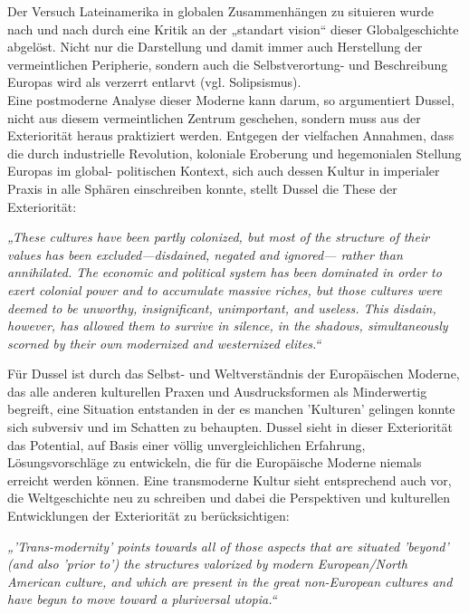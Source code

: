Der Versuch Lateinamerika in globalen Zusammenhängen zu situieren wurde nach und
nach durch eine Kritik an der „standart vision“\footnotemark {} dieser Globalgeschichte
abgelöst. Nicht nur die Darstellung und damit immer auch Herstellung der
vermeintlichen Peripherie, sondern auch die Selbstverortung- und Beschreibung
Europas wird als verzerrt entlarvt (vgl. Solipsismus).\footnotemark
{}\\
 Eine postmoderne Analyse
dieser Moderne kann darum, so argumentiert Dussel, nicht aus diesem
vermeintlichen Zentrum geschehen, sondern muss aus der Exteriorität heraus
praktiziert werden. Entgegen der vielfachen Annahmen, dass die durch
industrielle Revolution, koloniale Eroberung und hegemonialen Stellung Europas
im global- politischen Kontext, sich auch dessen Kultur in imperialer Praxis in alle Sphären einschreiben konnte, stellt Dussel die These der Exteriorität:
\begin{myenv} 
    \textit{„These cultures have been partly colonized, but most of the
    structure of their values has been excluded—disdained, negated and ignored—
    rather than annihilated. The economic and political system has been
    dominated in order to exert colonial power and to accumulate massive riches,
    but those cultures were deemed to be unworthy, insignificant, unimportant,
    and useless. This disdain, however, has allowed them to survive in silence,
in the shadows, simultaneously scorned by their own modernized and westernized
elites.“\footnotemark {}} \end{myenv}

Für Dussel ist durch das Selbst- und Weltverständnis der Europäischen Moderne,
das alle anderen kulturellen Praxen und Ausdrucksformen als Minderwertig
begreift, eine Situation entstanden in der es manchen 'Kulturen' gelingen konnte
sich subversiv und im Schatten zu behaupten. Dussel sieht in dieser Exteriorität
das Potential, auf Basis einer völlig unvergleichlichen Erfahrung,
Lösungsvorschläge zu entwickeln, die für die Europäische Moderne niemals
erreicht werden können. Eine transmoderne Kultur sieht entsprechend auch vor,
die Weltgeschichte neu zu schreiben und dabei die Perspektiven und kulturellen
Entwicklungen der Exteriorität zu berücksichtigen:

\begin{myenv} \textit{„'Trans-modernity' points towards all of those aspects
    that are situated 'beyond' (and also 'prior to') the structures valorized by
    modern European/North American culture, and which are present in the great
    non-European cultures and have begun to move toward a pluriversal
utopia.“\footnotemark {}} \end{myenv}

